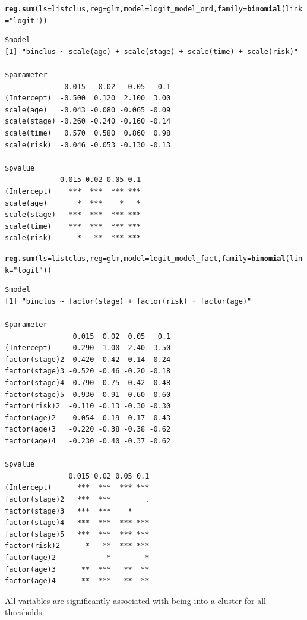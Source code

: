 \documentclass[]{revtex4}\usepackage[]{graphicx}\usepackage[]{color}
\makeatletter
\newcommand{\hlstr}[1]{\textcolor[rgb]{0.192,0.494,0.8}{#1}}%
\newcommand{\hlstd}[1]{\textcolor[rgb]{0.345,0.345,0.345}{#1}}%
\newcommand{\hlkwc}[1]{\textcolor[rgb]{0.333,0.667,0.333}{#1}}%
\newcommand{\hlkwd}[1]{\textcolor[rgb]{0.737,0.353,0.396}{\textbf{#1}}}%
\newenvironment{kframe}{%
 \def\at@end@of@kframe{}%
 \ifinner\ifhmode%
  \def\at@end@of@kframe{\end{minipage}}%
  \begin{minipage}{\columnwidth}%
 \fi\fi%
 \def\FrameCommand##1{\hskip\@totalleftmargin \hskip-\fboxsep
 \colorbox{shadecolor}{##1}\hskip-\fboxsep
     \hskip-\linewidth \hskip-\@totalleftmargin \hskip\columnwidth}%
 \MakeFramed {\advance\hsize-\width
   \@totalleftmargin\z@ \linewidth\hsize
   \@setminipage}}%
 {\par\unskip\endMakeFramed%
 \at@end@of@kframe}
\newenvironment{knitrout}{}{} %
\makeatother
\begin{document}
\begin{knitrout}
\color{fgcolor}\begin{kframe}
\begin{alltt}
\hlkwd{reg.sum}\hlstd{(}\hlkwc{ls} \hlstd{= listclus,} \hlkwc{reg} \hlstd{= glm,} \hlkwc{model} \hlstd{= logit_model_ord,} \hlkwc{family} \hlstd{=} \hlkwd{binomial}\hlstd{(}\hlkwc{link} \hlstd{=} \hlstr{"logit"}\hlstd{))}
\end{alltt}
\begin{verbatim}
$model
[1] "binclus ~ scale(age) + scale(stage) + scale(time) + scale(risk)"

$parameter
              0.015   0.02   0.05   0.1
(Intercept)  -0.500  0.120  2.100  3.00
scale(age)   -0.043 -0.080 -0.065 -0.09
scale(stage) -0.260 -0.240 -0.160 -0.14
scale(time)   0.570  0.580  0.860  0.98
scale(risk)  -0.046 -0.053 -0.130 -0.13

$pvalue
             0.015 0.02 0.05 0.1
(Intercept)    ***  ***  *** ***
scale(age)       *  ***    *   *
scale(stage)   ***  ***  *** ***
scale(time)    ***  ***  *** ***
scale(risk)      *   **  *** ***
\end{verbatim}
\begin{alltt}
\hlkwd{reg.sum}\hlstd{(}\hlkwc{ls} \hlstd{= listclus,} \hlkwc{reg} \hlstd{= glm,} \hlkwc{model} \hlstd{= logit_model_fact,} \hlkwc{family} \hlstd{=} \hlkwd{binomial}\hlstd{(}\hlkwc{link} \hlstd{=} \hlstr{"logit"}\hlstd{))}
\end{alltt}
\begin{verbatim}
$model
[1] "binclus ~ factor(stage) + factor(risk) + factor(age)"

$parameter
                0.015  0.02  0.05   0.1
(Intercept)     0.290  1.00  2.40  3.50
factor(stage)2 -0.420 -0.42 -0.14 -0.24
factor(stage)3 -0.520 -0.46 -0.20 -0.18
factor(stage)4 -0.790 -0.75 -0.42 -0.48
factor(stage)5 -0.930 -0.91 -0.60 -0.60
factor(risk)2  -0.110 -0.13 -0.30 -0.30
factor(age)2   -0.054 -0.19 -0.17 -0.43
factor(age)3   -0.220 -0.38 -0.38 -0.62
factor(age)4   -0.230 -0.40 -0.37 -0.62

$pvalue
               0.015 0.02 0.05 0.1
(Intercept)      ***  ***  *** ***
factor(stage)2   ***  ***        .
factor(stage)3   ***  ***    *    
factor(stage)4   ***  ***  *** ***
factor(stage)5   ***  ***  *** ***
factor(risk)2      *   **  *** ***
factor(age)2            *        *
factor(age)3      **  ***   **  **
factor(age)4      **  ***   **  **
\end{verbatim}
\end{kframe}
\end{knitrout}
All variables are significantly associated with being into a cluster for all thresholds
\end{document}
